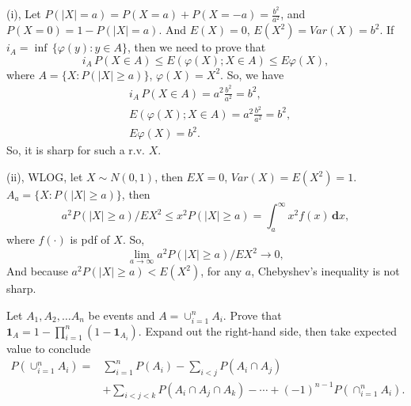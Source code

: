 \documentclass[en, normal, 11pt, black]{elegantnote}
\newenvironment{exercise}[1]{\begin{tcolorbox}[colback=black!15, colframe=black!80, breakable, title=#1]}{\end{tcolorbox}}
\renewenvironment{proof}{\begin{tcolorbox}[colback=white, colframe=black!50, breakable, title=Proof. ]\setlength{\parskip}{0.8em}}{\\\rightline{$\square$}\end{tcolorbox}}
\newcommand{\der}{\,\mathbf{d}}
\begin{document}
    \begin{proof}
        (i), Let $P(|X|=a)=P(X=a)+P(X=-a)=\frac{b^2}{a^2}$, and $P(X=0)=1-P(|X|=a)$. And $E(X)=0$, $E(X^2)=Var(X)=b^2$. If $i_{A}=\inf\,\{\varphi(y): y \in A\}$, then we need to prove that
        \[
            i_{A}\,P(X \in A) \leq E(\varphi(X) ; X \in A) \leq E \varphi(X), 
        \]
        where $A=\{X:P(|X|\geqslant a)\}$, $\varphi(X)=X^2$. So, we have
        \begin{align*}
            &i_{A}\,P(X \in A)=a^2\frac{b^2}{a^2}=b^2, \\
            &E(\varphi(X) ; X \in A)=a^2\frac{b^2}{a^2}=b^2, \\
            &E \varphi(X)=b^2. 
        \end{align*}
        So, it is sharp for such a r.v. $X$. 
        
        (ii), WLOG, let $X\sim N(0,1)$, then $EX=0$, $Var(X)=E(X^2)=1$. $A_a=\{X:P(|X|\geqslant a)\}$, then
        \[
            a^{2} P(|X| \geq a) / E X^{2}\leqslant x^2 P(|X| \geq a)=\int_{a}^\infty x^2 f(x)\der x, 
        \]
        where $f(\cdot)$ is pdf of $X$. So, 
        \[
            \lim_{a\to\infty}a^{2} P(|X| \geq a) / E X^{2}\longrightarrow 0, 
        \]
        And because $a^{2} P(|X| \geq a)<E(X^2)$, for any $a$, Chebyshev’s inequality is not sharp. 
    \end{proof}


    \begin{exercise}{1.6.9. Inclusion-exclusion formula.}
        Let $A_{1}, A_{2}, \ldots A_{n}$ be events and $A=\cup_{i=1}^{n} A_{i}$. Prove that $\mathbf{1}_{A}=1-\prod_{i=1}^{n}\left(1-\mathbf{1}_{A_{i}}\right)$. Expand out the right-hand side, then take expected value to conclude
        \begin{align*}
            P\left(\cup_{i=1}^{n} A_{i}\right)=& \sum_{i=1}^{n} P\left(A_{i}\right)-\sum_{i<j} P\left(A_{i} \cap A_{j}\right) \\
            &+\sum_{i<j<k} P\left(A_{i} \cap A_{j} \cap A_{k}\right)-\cdots+(-1)^{n-1} P\left(\cap_{i=1}^{n} A_{i}\right). 
        \end{align*}
    \end{exercise}
\end{document}
